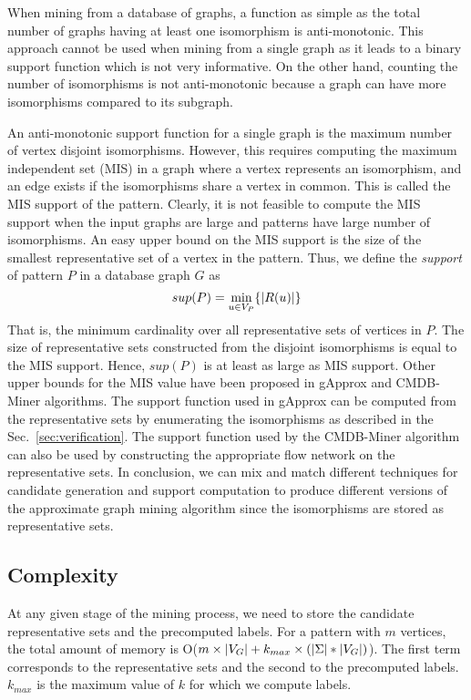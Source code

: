 When mining from a database of graphs, a function as simple as the total
number of graphs having at least one isomorphism is anti-monotonic. This
approach cannot be used when mining from a single graph as it leads to a
binary support function which is not very informative. On the other
hand, counting the number of isomorphisms is not anti-monotonic because
a graph can have more isomorphisms compared to its subgraph.

An anti-monotonic support function for a single graph is the maximum
number of vertex disjoint isomorphisms. However, this requires computing
the maximum independent set (MIS) in a graph where a vertex represents
an isomorphism, and an edge exists if the isomorphisms share a vertex in
common.  This is called the MIS support of the pattern.
Clearly, it is not feasible to compute the MIS support when the input
graphs are large and patterns have large number of isomorphisms. An easy
upper bound on the MIS support is the size of the smallest
representative set of a vertex in the pattern. 
Thus, we define the {\em support}
of pattern $P$ in a database graph $G$ as 
$$sup(P) = \min_{u \in V_P} \{
|R(u)| \}$$ 
That is, the minimum cardinality over all representative
sets of vertices in $P$.  The size of representative sets constructed
from the disjoint isomorphisms is equal to the MIS support. Hence,
$sup(P)$ is at least as large as MIS support.  Other upper bounds for the
MIS value have been proposed in gApprox \cite{gapprox} and CMDB-Miner
\cite{2011-icdm} algorithms. The support function used in gApprox can be
computed from the representative sets by enumerating the isomorphisms as
described in the Sec.~\ref{sec:verification}.  The support function
used by the CMDB-Miner algorithm can also be used by constructing the
appropriate flow network on the representative sets.
In conclusion, we can mix and match different techniques for candidate
generation and support computation to produce different versions of the
approximate graph mining algorithm since the isomorphisms are
stored as representative sets.

\subsection{Complexity} 
\medskip{} At any given stage of the
mining process, we need to store the candidate representative sets and
the precomputed \khop labels. For a pattern with $m$ vertices, the total
amount of memory is O($m \times |V_G| + k_{max} \times ( |\Sigma| *
|V_G|)$). The first term corresponds to the representative sets and the
second to the precomputed \khop labels.  $k_{max}$ is the maximum value
of $k$ for which we compute \khop labels.

